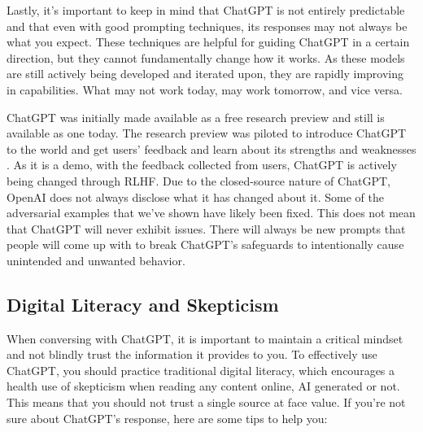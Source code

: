 \documentclass[12pt]{article}
\begin{document}
Lastly, it's important to keep in mind that ChatGPT is not entirely predictable and that even with good prompting techniques, its responses may not always be what you expect. These techniques are helpful for guiding ChatGPT in a certain direction, but they cannot fundamentally change how it works. As these models are still actively being developed and iterated upon, they are rapidly improving in capabilities. What may not work today, may work tomorrow, and vice versa. 

ChatGPT was initially made available as a free research preview and still is available as one today. The research preview was piloted to introduce ChatGPT to the world and get users' feedback and learn about its strengths and weaknesses \cite{introducing_chatgpt_2022}. As it is a demo, with the feedback collected from users, ChatGPT is actively being changed through RLHF. Due to the closed-source nature of ChatGPT, OpenAI does not always disclose what it has changed about it. Some of the adversarial examples that we've shown have likely been fixed. This does not mean that ChatGPT will never exhibit issues. There will always be new prompts that people will come up with to break ChatGPT's safeguards to intentionally cause unintended and unwanted behavior.

\subsection{Digital Literacy and Skepticism} \label{sec:literacy}
When conversing with ChatGPT, it is important to maintain a critical mindset and not blindly trust the information it provides to you. To effectively use ChatGPT, you should practice traditional digital literacy, which encourages a health use of skepticism when reading any content online, AI generated or not. This means that you should not trust a single source at face value. If you're not sure about ChatGPT's response, here are some tips to help you:
\end{document}
